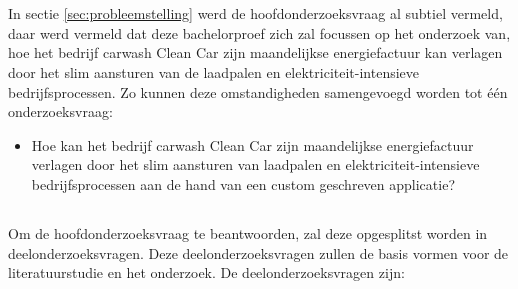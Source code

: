 \section{}%
\label{sec:onderzoeksvraag}

\subsection{}
\label{subsec:hoofdonderzoeksvraag}

In sectie \ref{sec:probleemstelling} werd de hoofdonderzoeksvraag al subtiel vermeld, daar werd vermeld dat deze bachelorproef zich zal focussen op het onderzoek van, hoe het bedrijf carwash Clean Car zijn maandelijkse energiefactuur kan verlagen door het slim aansturen van de laadpalen en elektriciteit-intensieve bedrijfsprocessen. Zo kunnen deze omstandigheden samengevoegd worden tot één onderzoeksvraag:

\begin{itemize}
  \item Hoe kan het bedrijf carwash Clean Car zijn maandelijkse energiefactuur verlagen door het slim aansturen van laadpalen en elektriciteit-intensieve bedrijfsprocessen aan de hand van een custom geschreven applicatie?
\end{itemize}

\pagebreak

\subsection{}
\label{subsec:deelonderzoeksvragen}

Om de hoofdonderzoeksvraag te beantwoorden, zal deze opgesplitst worden in deelonderzoeksvragen. Deze deelonderzoeksvragen zullen de basis vormen voor de literatuurstudie en het onderzoek. De deelonderzoeksvragen zijn:

